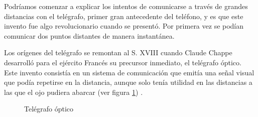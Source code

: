 Podríamos comenzar a explicar los intentos de comunicarse a través de grandes distancias con el telégrafo, primer gran antecedente del teléfono, y es que este invento fue algo revolucionario cuando se presentó. Por primera vez se podían comunicar dos puntos distantes de manera instantánea.

Los orígenes del telégrafo se remontan al S. XVIII cuando Claude Chappe desarrolló para el ejército Francés su precursor inmediato, el telégrafo óptico. Este invento consistía en un sistema de comunicación que emitía una señal visual que podía repetirse en la distancia, aunque solo tenía utilidad en las distancias a las que el ojo pudiera abarcar (ver figura \ref{fig:telegrafo_optico}) \cite{Holz94}.

\begin{figure}[h!btp]
	\begin{adjustbox}{minipage=\linewidth, fbox}
		\centering
		\hspace{10mm}
	\end{adjustbox}
\caption{Telégrafo óptico}
	\label{fig:telegrafo_optico}
\end{figure}

